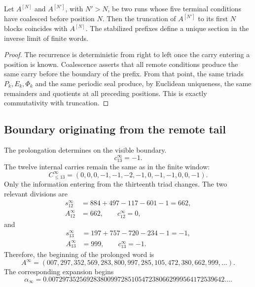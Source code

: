 \begin{theorem}
\label{p3-83-c25-s5:thm:compatibilidad-prolongacion-alpha}
Let \(A^{[N]}\) and \(A^{[N']}\), with \(N'>N\), be two runs whose
five terminal conditions have coalesced before position \(N\).
Then the truncation of \(A^{[N']}\) to its first \(N\) blocks
coincides with \(A^{[N]}\). The stabilized prefixes define a unique
section in the inverse limit of finite words.
\end{theorem}

\begin{proof}
The recurrence is deterministic from right to left once the carry entering a
position is known. Coalescence asserts that all remote
conditions produce the same carry before the boundary of the
prefix. From that point, the same triads \(P_k,E_k,\Phi_k\) and the same
periodic seal produce, by Euclidean uniqueness, the same remainders and
quotients at all preceding positions. This is exactly
commutativity with truncation.
\end{proof}

\subsection{Boundary originating from the remote tail}

The prolongation determines on the visible boundary.
\[
 c_{13}^{\infty}=-1.
\]
The twelve internal carries remain the same as in the finite window:
\[
 \boxed{
 C_{\leq13}^{\infty}
 =(0,0,0,-1,-1,-2,-1,0,-1,-1,0,0,-1).}
\]
Only the information entering from the thirteenth triad changes. The
two relevant divisions are
\[
\begin{aligned}
 s_{12}^{\infty}
 &=884+497-117-601-1=662,\\
 A_{12}^{\infty}&=662,
 \qquad c_{12}^{\infty}=0,
\end{aligned}
\]
and
\[
\begin{aligned}
 s_{13}^{\infty}
 &=197+757-720-234-1=-1,\\
 A_{13}^{\infty}&=999,
 \qquad c_{13}^{\infty}=-1.
\end{aligned}
\]
Therefore, the beginning of the prolonged word is
\[
 \boxed{
 A^{\infty}
 =(007,297,352,569,283,800,997,285,105,472,380,662,999,\ldots).}
\]
The corresponding expansion begins
\begin{equation}
 \boxed{
 \alpha_{\infty}
 =0.007297352569283800997285105472380662999564172539642\ldots.}
 \label{p3-83-c25-s5:eq:alpha-infinita-autonoma}
\end{equation}

